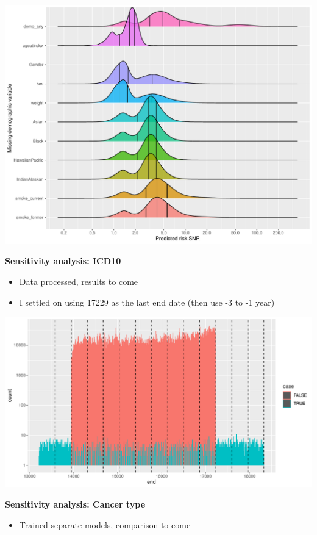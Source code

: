 \documentclass[12pt]{article}
\begin{document}
\begin{center}
\includegraphics[width=\textwidth]{sensitivity_missing/demo_missing_values.pdf}
\end{center}

\newpage
\textbf{Sensitivity analysis: ICD10}
\begin{itemize}
	\item Data processed, results to come
	\item I settled on using 17229 as the last end date (then use
	-3 to -1 year)
\end{itemize}

\begin{center}
\includegraphics[width=\textwidth]{sensitivity_icd10/histogram.pdf}
\end{center}

\textbf{Sensitivity analysis: Cancer type}
\begin{itemize}
	\item Trained separate models, comparison to come
\end{itemize}
\end{document}
